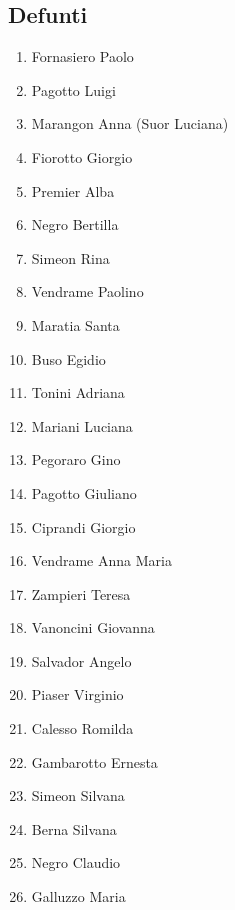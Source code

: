 \subsection{Defunti}
\begin{multicols}{2}
\begin{enumerate}
  \item Fornasiero Paolo
  \item Pagotto Luigi
  \item Marangon Anna (Suor Luciana)
  \item Fiorotto Giorgio
  \item Premier Alba
  \item Negro Bertilla
  \item Simeon Rina
  \item Vendrame Paolino
  \item Maratia Santa
  \item Buso Egidio
  \item Tonini Adriana
  \item Mariani Luciana
  \item Pegoraro Gino
  \item Pagotto Giuliano
  \item Ciprandi Giorgio
  \item Vendrame Anna Maria
  \item Zampieri Teresa
  \item Vanoncini Giovanna
  \item Salvador Angelo
  \item Piaser Virginio
  \item Calesso Romilda
  \item Gambarotto Ernesta
  \item Simeon Silvana
  \item Berna Silvana
  \item Negro Claudio
  \item Galluzzo Maria
\end{enumerate}
\end{multicols}

